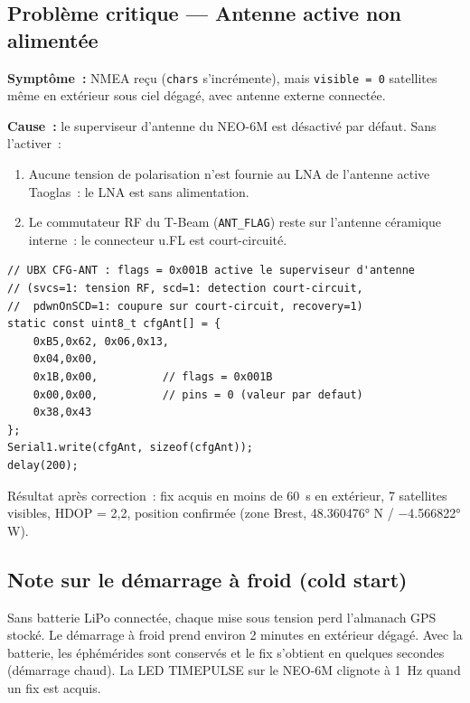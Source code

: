 \documentclass[12pt,a4paper]{article}
\begin{document}
\subsection{Problème critique — Antenne active non alimentée}

\begin{warningbox}
  \textbf{Symptôme~:} NMEA reçu (\texttt{chars} s'incrémente), mais
  \texttt{visible = 0} satellites même en extérieur sous ciel dégagé,
  avec antenne externe connectée.

  \textbf{Cause~:} le superviseur d'antenne du NEO-6M est désactivé par
  défaut. Sans l'activer~:
  \begin{enumerate}
    \item Aucune tension de polarisation n'est fournie au LNA de l'antenne
      active Taoglas~: le LNA est sans alimentation.
    \item Le commutateur RF du T-Beam (\texttt{ANT\_FLAG}) reste sur l'antenne
      céramique interne~: le connecteur u.FL est court-circuité.
  \end{enumerate}
\end{warningbox}

\begin{lstlisting}[style=cpp, caption={GpsUart.cpp -- activation superviseur d'antenne (CFG-ANT)}]
// UBX CFG-ANT : flags = 0x001B active le superviseur d'antenne
// (svcs=1: tension RF, scd=1: detection court-circuit,
//  pdwnOnSCD=1: coupure sur court-circuit, recovery=1)
static const uint8_t cfgAnt[] = {
    0xB5,0x62, 0x06,0x13,
    0x04,0x00,
    0x1B,0x00,          // flags = 0x001B
    0x00,0x00,          // pins = 0 (valeur par defaut)
    0x38,0x43
};
Serial1.write(cfgAnt, sizeof(cfgAnt));
delay(200);
\end{lstlisting}

\begin{okbox}
  Résultat après correction~: fix acquis en moins de 60~s en extérieur,
  7 satellites visibles, HDOP = 2,2, position confirmée (zone Brest,
  48.360476° N / $-$4.566822° W).
\end{okbox}

\subsection{Note sur le démarrage à froid (cold start)}

Sans batterie LiPo connectée, chaque mise sous tension perd l'almanach GPS
stocké. Le démarrage à froid prend environ 2 minutes en extérieur dégagé.
Avec la batterie, les éphémérides sont conservés et le fix s'obtient en
quelques secondes (démarrage chaud). La LED TIMEPULSE sur le NEO-6M clignote
à 1~Hz quand un fix est acquis.
\end{document}
